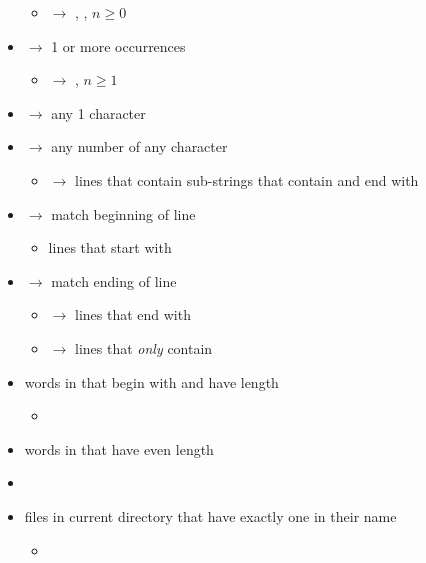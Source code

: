 \begin{itemize}
\begin{itemize}
              \item {} $ \rightarrow $ ,
                    , $ n\ge 0 $
          \end{itemize}
    \item \code{+} $ \rightarrow $ 1 or more occurrences
          \begin{itemize}
              \item {} $ \rightarrow $
                    , $ n\ge 1 $
          \end{itemize}
    \item {} $ \rightarrow $ any 1 character
    \item {} $ \rightarrow $ any number of any character
          \begin{itemize}
              \item {} $ \rightarrow $ lines that contain sub-strings
                    that contain  and end with 
          \end{itemize}
    \item \code{\textasciicircum} $ \rightarrow $ match beginning of line
          \begin{itemize}
              \item {} lines that start with 
          \end{itemize}
    \item \code{\$} $ \rightarrow $ match ending of line
          \begin{itemize}
              \item {} $ \rightarrow $ lines that end with 
              \item {}
                    $ \rightarrow $ lines that \emph{only} contain
          \end{itemize}
    \item words in  that begin with  and have length 
          \begin{itemize}
              \item {}

          \end{itemize}
    \item words in  that have even length
    \item {}
    \item files in current directory that have exactly one  in their
          name
          \begin{itemize}
              \item {}
          \end{itemize}
\end{itemize}

